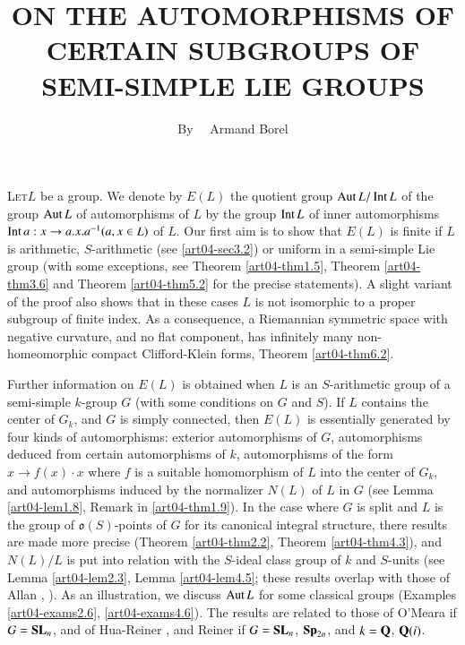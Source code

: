 \title{ON THE AUTOMORPHISMS OF CERTAIN SUBGROUPS OF SEMI-SIMPLE LIE GROUPS}

\author{By~~ Armand Borel}

\date{}

\maketitle

\setcounter{pageoriginal}{42}
\textsc{Let}\pageoriginale $L$ be a group. We denote by $E(L)$ the quotient group $\operatorname{\mathrm{Aut}} L/\operatorname{\mathrm{Int}} L$ of the group $\operatorname{\mathrm{Aut}} L$ of automorphisms of $L$ by the group $\operatorname{\mathrm{Int}} L$ of inner automorphisms $\operatorname{\mathrm{Int}} a:x\to a.x.a^{-1}(a,x\in L)$ of $L$. Our first aim is to show that $E(L)$ is finite if $L$ is arithmetic, $S$-arithmetic (see \ref{art04-sec3.2}) or uniform in a semi-simple Lie group (with some exceptions, see Theorem \ref{art04-thm1.5}, Theorem \ref{art04-thm3.6} and Theorem \ref{art04-thm5.2} for the precise statements). A slight variant of the proof also shows that in these cases $L$ is not isomorphic to a proper subgroup of finite index. As a consequence, a Riemannian symmetric space with negative curvature, and no flat component, has infinitely many non-homeomorphic compact Clifford-Klein forms, Theorem \ref{art04-thm6.2}.

Further information on $E(L)$ is obtained when $L$ is an $S$-arithmetic group of a semi-simple $k$-group $G$ (with some conditions on $G$ and $S$). If $L$ contains the center of $G_{k}$, and $G$ is simply connected, then $E(L)$ is essentially generated by four kinds of automorphisms: exterior automorphisms of $G$, automorphisms deduced from certain automorphisms of $k$, automorphisms of the form $x\to f(x)\cdot x$ where $f$ is a suitable homomorphism of $L$ into the center of $G_{k}$, and automorphisms induced by the normalizer $N(L)$ of $L$ in $G$ (see Lemma \ref{art04-lem1.8}, Remark in \ref{art04-thm1.9}). In the case where $G$ is split and $L$ is the group of $\mathfrak{o}(S)$-points of $G$ for its canonical integral structure, there results are made more precise (Theorem \ref{art04-thm2.2}, Theorem \ref{art04-thm4.3}), and $N(L)/L$ is put into relation with the $S$-ideal class group of $k$ and $S$-units (see Lemma \ref{art04-lem2.3}, Lemma \ref{art04-lem4.5}; these results overlap with those of Allan \cite{art04-key1}, \cite{art04-key2}). As an illustration, we discuss $\operatorname{\mathrm{Aut}} L$ for some classical groups (Examples \ref{art04-exams2.6}, \ref{art04-exams4.6}). The results are related to those of O'Meara \cite{art04-key24} if $G=\mathbf{SL}_{n}$, and of Hua-Reiner \cite{art04-key12}, \cite{art04-key13} and Reiner \cite{art04-key27} if $G=\mathbf{SL}_{n}$, $\mathbf{Sp}_{2n}$, and $k=\mathbf{Q}$, $\mathbf{Q}(i)$.

